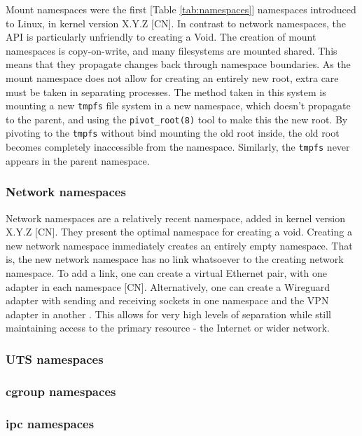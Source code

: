 \documentclass[sigplan]{acmart}
\begin{document}
Mount namespaces were the first [Table \ref{tab:namespaces}] namespaces introduced to Linux, in kernel version X.Y.Z [CN]. In contrast to network namespaces, the API is particularly unfriendly to creating a Void. The creation of mount namespaces is copy-on-write, and many filesystems are mounted shared. This means that they propagate changes back through namespace boundaries. As the mount namespace does not allow for creating an entirely new root, extra care must be taken in separating processes. The method taken in this system is mounting a new \texttt{tmpfs} file system in a new namespace, which doesn't propagate to the parent, and using the \texttt{pivot\_root(8)} tool to make this the new root. By pivoting to the \texttt{tmpfs} without bind mounting the old root inside, the old root becomes completely inaccessible from the namespace. Similarly, the \texttt{tmpfs} never appears in the parent namespace.

\subsubsection{Network namespaces}

Network namespaces are a relatively recent namespace, added in kernel version X.Y.Z [CN]. They present the optimal namespace for creating a void. Creating a new network namespace immediately creates an entirely empty namespace. That is, the new network namespace has no link whatsoever to the creating network namespace. To add a link, one can create a virtual Ethernet pair, with one adapter in each namespace [CN]. Alternatively, one can create a Wireguard adapter with sending and receiving sockets in one namespace and the VPN adapter in another \citep[§7.3]{donenfeld_wireguard_2017}. This allows for very high levels of separation while still maintaining access to the primary resource - the Internet or wider network.

\subsubsection{UTS namespaces}


\subsubsection{cgroup namespaces}


\subsubsection{ipc namespaces}
\end{document}
